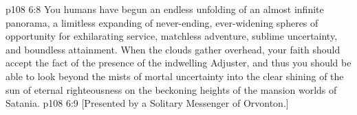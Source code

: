 \vs p108 6:8 \pc You humans have begun an endless unfolding of an almost infinite panorama, a limitless expanding of never\hyp{}ending, ever\hyp{}widening spheres of opportunity for exhilarating service, matchless adventure, sublime uncertainty, and boundless attainment. When the clouds gather overhead, your faith should accept the fact of the presence of the indwelling Adjuster, and thus you should be able to look beyond the mists of mortal uncertainty into the clear shining of the sun of eternal righteousness on the beckoning heights of the mansion worlds of Satania.
\vsetoff
\vs p108 6:9 [Presented by a Solitary Messenger of Orvonton.]
